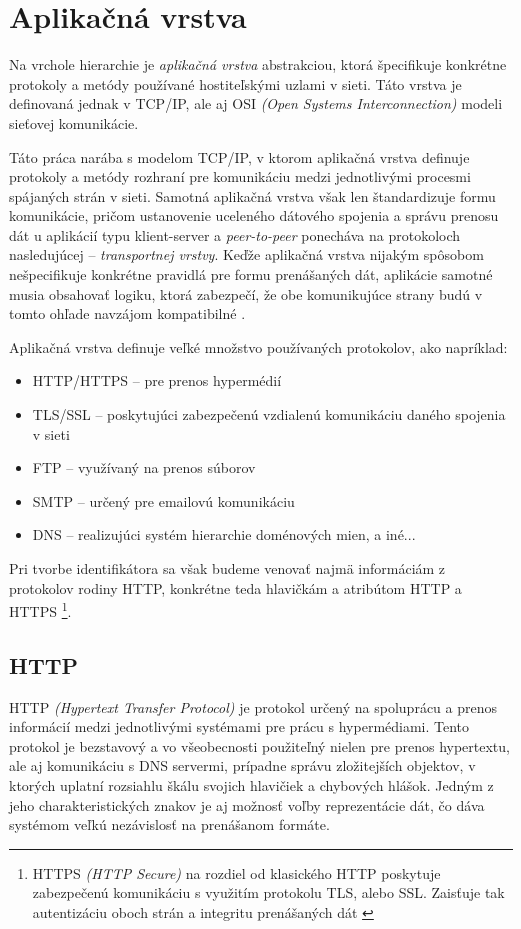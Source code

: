 \documentclass[
  printed, %
  table,   %
  lof,     %
  nolot,   %
  nocover
]{fithesis3}
\begin{document}
\section{Aplikačná vrstva}
Na vrchole hierarchie je \textit{aplikačná vrstva} abstrakciou, ktorá špecifikuje
konkrétne protokoly a metódy používané hostiteľskými uzlami v sieti. Táto
vrstva je definovaná jednak v TCP/IP, ale aj OSI
\textit{(Open Systems Interconnection)} modeli sieťovej komunikácie.

Táto práca narába s modelom TCP/IP, v ktorom aplikačná vrstva definuje
protokoly a metódy rozhraní pre komunikáciu medzi jednotlivými procesmi
spájaných strán v sieti. Samotná aplikačná vrstva však len štandardizuje formu
komunikácie, pričom ustanovenie uceleného dátového spojenia a správu prenosu dát
u aplikácií typu klient-server a \textit{peer-to-peer} ponecháva na protokoloch
nasledujúcej -- \textit{transportnej vrstvy}. Keďže aplikačná vrstva nijakým spôsobom
nešpecifikuje konkrétne pravidlá pre formu prenášaných dát,
aplikácie samotné musia obsahovať logiku, ktorá zabezpečí, že obe komunikujúce
strany budú v tomto ohľade navzájom kompatibilné \cite{rfc1123}.

Aplikačná vrstva definuje veľké množstvo používaných protokolov, ako napríklad:
\begin{itemize}
	\item HTTP/HTTPS -- pre prenos hypermédií 
	\item TLS/SSL -- poskytujúci zabezpečenú vzdialenú komunikáciu daného spojenia v sieti
	\item FTP -- využívaný na prenos súborov
	\item SMTP -- určený pre emailovú komunikáciu
	\item DNS -- realizujúci systém hierarchie doménových mien, a iné...
\end{itemize}
Pri tvorbe identifikátora sa však budeme venovať najmä informáciám z protokolov
rodiny HTTP, konkrétne teda hlavičkám a atribútom HTTP a HTTPS \footnote{HTTPS 
\textit{(HTTP Secure)} na rozdiel od klasického HTTP poskytuje zabezpečenú komunikáciu
s využitím protokolu TLS, alebo SSL. Zaisťuje tak autentizáciu oboch strán a integritu prenášaných dát \cite{rfc2818}}.

\subsection{HTTP}
HTTP \textit{(Hypertext Transfer Protocol)} je protokol určený
na spoluprácu a prenos informácií medzi jednotlivými systémami pre
prácu s hypermédiami. Tento protokol je bezstavový a vo všeobecnosti
použiteľný nielen pre prenos hypertextu, ale aj komunikáciu s DNS servermi, prípadne
správu zložitejších objektov, v ktorých uplatní rozsiahlu škálu svojich
hlavičiek a chybových hlášok. Jedným z jeho charakteristických znakov je aj
možnosť voľby reprezentácie dát, čo dáva systémom veľkú nezávislosť na
prenášanom formáte.
\end{document}
